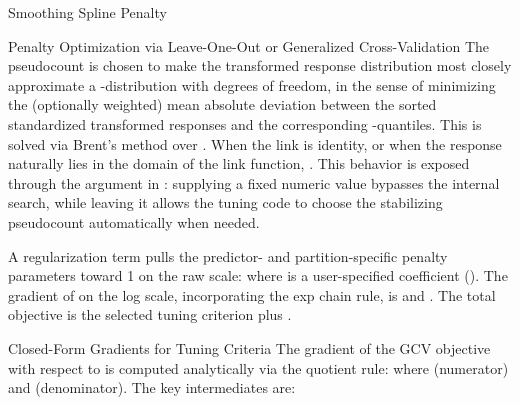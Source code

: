 \begin{Section}{Smoothing Spline Penalty}
\begin{SubSection}{Penalty Optimization via Leave-One-Out or Generalized Cross-Validation}
 The pseudocount \eqn{\delta}{} is chosen to
make the transformed response distribution most closely approximate a
-distribution with  degrees of freedom, in the sense of
minimizing the (optionally weighted) mean absolute deviation between the
sorted standardized transformed responses and the corresponding
-quantiles. This is solved via Brent's method over
\eqn{[10^{-64}, 1]}{}. When the link is identity, or when the response
naturally lies in the domain of the link function, .
This behavior is exposed through the  argument in
: supplying a fixed numeric value bypasses the internal
search, while leaving it  allows the tuning code to choose the
stabilizing pseudocount automatically when needed.

 A regularization term pulls the
predictor- and partition-specific penalty parameters toward 1 on the raw
scale:
where  is a user-specified coefficient
(). The gradient of  on the log
scale, incorporating the exp chain rule, is
and
.
The total objective is the selected tuning criterion plus
.
\end{SubSection}


%
\begin{SubSection}{Closed-Form Gradients for Tuning Criteria}
The gradient of the GCV objective with respect to
 is computed analytically via the quotient
rule:
where  (numerator) and
 (denominator). The key intermediates are:
\begin{itemize}


\end{itemize}
\end{SubSection}
\end{Section}
